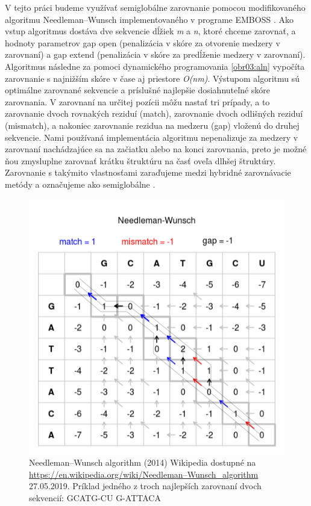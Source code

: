 \indent  V tejto práci budeme využívať semiglobálne zarovnanie pomocou modifikovaného algoritmu Needleman–Wunsch \cite{Needleman70}  implementovaného v programe \mbox{EMBOSS} \cite{Emboss}. Ako vstup algoritmus dostáva dve sekvencie dĺžiek \textit{m} a \textit{n}, ktoré chceme zarovnať, a hodnoty parametrov gap open (penalizácia v skóre za otvorenie medzery v zarovnaní) a gap extend (penalizácia v skóre za predĺženie medzery v zarovnaní). Algoritmus následne za pomoci dynamického programovania \autoref{obr03:aln} vypočíta zarovnanie s najnižším skóre v čase aj priestore \textit{O(nm)}.  Výstupom algoritmu sú optimálne zarovnané sekvencie a príslušné najlepšie dosiahnuteľné skóre zarovnania. V zarovnaní na určitej pozícii môžu nastať tri prípady, a to zarovnanie dvoch rovnakých reziduí (match), zarovnanie dvoch odlišných reziduí (mismatch), a nakoniec zarovnanie rezidua na medzeru (gap) vloženú do druhej sekvencie. Nami používaná implementácia algoritmu nepenalizuje za medzery v zarovnaní nachádzajúce sa na začiatku alebo na konci zarovnania, preto je možné ňou zmysluplne zarovnať krátku štruktúru na časť oveľa dlhšej štruktúry. Zarovnanie s takýmito vlastnosťami zaraďujeme medzi hybridné zarovnávacie metódy a označujeme ako semiglobálne \cite{Brudno03}.

\begin{figure}%
\includegraphics[width=\textwidth]{../img/needlemanwunsch}
\caption{Needleman–Wunsch algorithm (2014) Wikipedia dostupné na \url{https://en.wikipedia.org/wiki/Needleman–Wunsch\_algorithm} 27.05.2019. Príklad jedného z troch najlepších zarovnaní dvoch sekvencií: \newline GCATG-CU \newline G-ATTACA}
\label{obr03:aln}
\end{figure}


